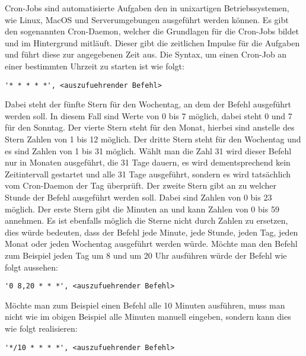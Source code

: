 Cron-Jobs sind automatisierte Aufgaben den in unixartigen Betriebssystemen, wie Linux, MacOS und Serverumgebungen ausgeführt werden können. Es gibt den sogenannten Cron-Daemon, welcher die Grundlagen für die Cron-Jobs bildet und im Hintergrund mitläuft. Dieser gibt die zeitlichen Impulse für die Aufgaben und führt diese zur angegebenen Zeit aus. Die Syntax, um einen Cron-Job an einer bestimmten Uhrzeit zu starten ist wie folgt:
\cite{cron_jobs_basics}
\newline
\begin{lstlisting}
'* * * * *', <auszufuehrender Befehl>
\end{lstlisting}
Dabei steht der fünfte Stern für den Wochentag, an dem der Befehl ausgeführt werden soll. In diesem Fall sind Werte von 0 bis 7 möglich, dabei steht 0 und 7 für den Sonntag.
\newline
Der vierte Stern steht für den Monat, hierbei sind anstelle des Stern Zahlen von 1 bis 12 möglich.
\newline
Der dritte Stern steht für den Wochentag und es sind Zahlen von 1 bis 31 möglich. Wählt man die Zahl 31 wird dieser Befehl nur in Monaten ausgeführt, die 31 Tage dauern, es wird dementsprechend kein Zeitintervall gestartet und alle 31 Tage ausgeführt, sondern es wird tatsächlich vom Cron-Daemon der Tag überprüft.
\newline
Der zweite Stern gibt an zu welcher Stunde der Befehl ausgeführt werden soll. Dabei sind Zahlen von 0 bis 23 möglich.
\newline
Der erste Stern gibt die Minuten an und kann Zahlen von 0 bis 59 annehmen.
\newline
Es ist ebenfalls möglich die Sterne nicht durch Zahlen zu ersetzen, dies würde bedeuten, dass der Befehl jede Minute, jede Stunde, jeden Tag, jeden Monat oder jeden Wochentag ausgeführt werden würde. Möchte man den Befehl zum Beispiel jeden Tag um 8 und um 20 Uhr ausführen würde der Befehl wie folgt aussehen:
\newline
\begin{lstlisting}
'0 8,20 * * *', <auszufuehrender Befehl>
\end{lstlisting}
Möchte man zum Beispiel einen Befehl alle 10 Minuten ausführen, muss man nicht wie im obigen Beispiel alle Minuten manuell eingeben, sondern kann dies wie folgt realisieren:
\newline
\begin{lstlisting}
'*/10 * * * *', <auszufuehrender Befehl>
\end{lstlisting}
\cite{cron_jobs_scheduling_examples}